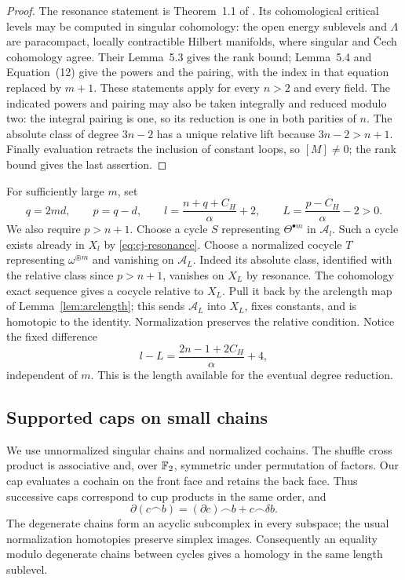 \begin{proof}
The resonance statement is Theorem~1.1 of
\cite{HingstonRademacher2013}.  Its cohomological critical levels
may be computed in singular cohomology: the open energy sublevels
and $\Lambda$ are paracompact, locally contractible Hilbert
manifolds, where singular and \v{C}ech cohomology agree.
Their Lemma~5.3 gives the rank bound;
Lemma~5.4 and Equation~(12) give the powers and the pairing, with the
index in that equation replaced by $m+1$.  These statements apply for
every $n>2$ and every field.  The indicated powers and pairing may also
be taken integrally and reduced modulo two: the integral pairing is
one, so its reduction is one in both parities of $n$.
The absolute class of degree $3n-2$ has a unique relative lift because
$3n-2>n+1$.  Finally evaluation retracts the inclusion of constant
loops, so $[M]\ne0$; the rank bound gives the last assertion.
\end{proof}

For sufficiently large $m$, set
\begin{equation}\label{eq:cj-thresholds}
 q=2md,\qquad p=q-d,\qquad
 l=\frac{n+q+C_H}{\alpha}+2,\qquad
 L=\frac{p-C_H}{\alpha}-2>0.
\end{equation}
We also require $p>n+1$.  Choose a cycle $S$ representing
$\Theta^{\bullet m}$ in $\mathcal A_l$.  Such a cycle exists already in
$X_l$ by \eqref{eq:cj-resonance}.  Choose a normalized cocycle $T$
representing $\omega^{\circledast m}$ and vanishing on $\mathcal A_L$.
Indeed its absolute class, identified with the relative class since
$p>n+1$, vanishes on $X_L$ by resonance.  The cohomology exact sequence
gives a cocycle relative to $X_L$.  Pull it back by the arclength
map of Lemma~\ref{lem:arclength}; this sends $\mathcal A_L$ into $X_L$, fixes
constants, and is homotopic to the identity.  Normalization preserves
the relative condition.  Notice the fixed difference
\begin{equation}\label{eq:cj-fixed-difference}
 l-L=\frac{2n-1+2C_H}{\alpha}+4,
\end{equation}
independent of $m$.  This is the length available for the eventual
degree reduction.

\subsection{Supported caps on small chains}

We use unnormalized singular chains and normalized cochains.  The
shuffle cross product is associative and, over $\mathbb F_2$, symmetric under
permutation of factors.  Our cap evaluates a cochain on the front
face and retains the back face.  Thus successive caps correspond to
cup products in the same order, and
\[
 \partial(c\frown b)=(\partial c)\frown b+c\frown\delta b.
\]
The degenerate chains form an acyclic subcomplex in every subspace;
the usual normalization homotopies preserve simplex images.
Consequently an equality modulo degenerate chains between cycles gives
a homology in the same length sublevel.

